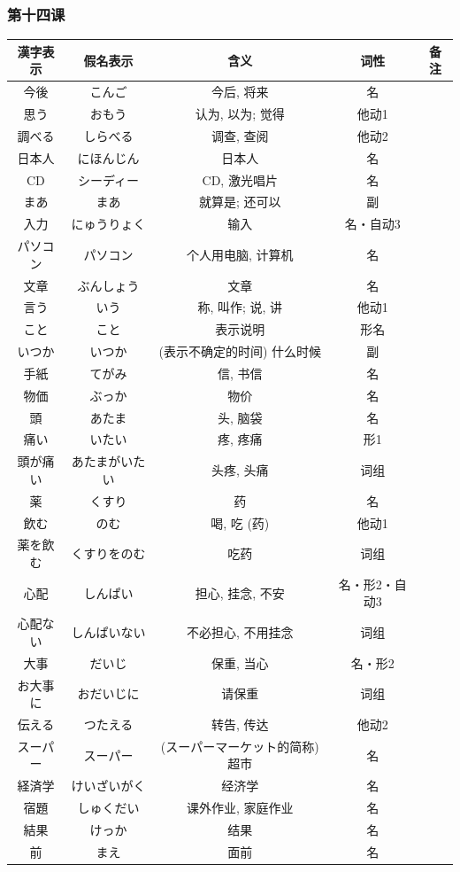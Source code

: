 \subsubsection{第十四课}
\begin{longtable}{|c|c|c|c|c|}
    \hline
漢字表示 & 假名表示  & 含义 & 词性 & 备注 \\ \hline\hline  
今後 & こんご & 今后, 将来 & 名 & \\ \hline
思う & おもう & 认为, 以为; 觉得 & 他动1 & \\ \hline
調べる & しらべる & 调查, 查阅 & 他动2 & \\ \hline
日本人 & にほんじん & 日本人 & 名 & \\ \hline
CD & シーディー & CD, 激光唱片 & 名 & \\ \hline
まあ & まあ & 就算是; 还可以 & 副 & \\ \hline
入力 & にゅうりょく & 输入 & 名・自动3 & \\ \hline
パソコン & パソコン & 个人用电脑, 计算机 & 名 & \\ \hline
文章 & ぶんしょう & 文章 & 名 & \\ \hline
言う & いう & 称, 叫作; 说, 讲 & 他动1 & \\ \hline
こと & こと & 表示说明 & 形名 & \\ \hline
いつか & いつか & (表示不确定的时间) 什么时候 & 副 & \\ \hline
手紙 & てがみ & 信, 书信 & 名 & \\ \hline
物価 & ぶっか & 物价 & 名 & \\ \hline
頭 & あたま & 头, 脑袋 & 名 & \\ \hline
痛い & いたい & 疼, 疼痛 & 形1 & \\ \hline
頭が痛い & あたまがいたい & 头疼, 头痛 & 词组 & \\ \hline
薬 & くすり & 药 & 名 & \\ \hline
飲む & のむ & 喝, 吃 (药) & 他动1 & \\ \hline
薬を飲む & くすりをのむ & 吃药 & 词组 & \\ \hline
心配 & しんぱい & 担心, 挂念, 不安 & 名・形2・自动3 & \\ \hline
心配ない & しんぱいない & 不必担心, 不用挂念 & 词组 & \\ \hline
大事 & だいじ & 保重, 当心 & 名・形2 & \\ \hline
お大事に & おだいじに & 请保重 & 词组 & \\ \hline
伝える & つたえる & 转告, 传达 & 他动2 & \\ \hline
スーパー & スーパー & (スーパーマーケット的简称) 超市 & 名 & \\ \hline
経済学 & けいざいがく & 经济学 & 名 & \\ \hline
宿題 & しゅくだい & 课外作业, 家庭作业 & 名 & \\ \hline
結果 & けっか & 结果 & 名 & \\ \hline
前 & まえ & 面前 & 名 & \\ \hline
\end{longtable}
